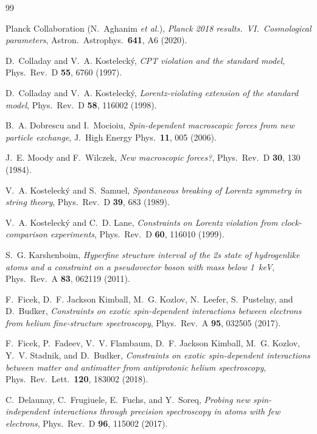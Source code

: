 \documentclass[12pt,a4paper]{report}
\begin{document}
\begin{thebibliography}{99}

Planck Collaboration (N.~Aghanim \textit{et al.}),
\textit{Planck 2018 results.\ VI.\ Cosmological parameters},
Astron.\ Astrophys.\ \textbf{641}, A6 (2020).

D.~Colladay and V.~A. Kosteleck\'{y},
\textit{CPT violation and the standard model},
Phys.\ Rev.\ D \textbf{55}, 6760 (1997).

D.~Colladay and V.~A. Kosteleck\'{y},
\textit{Lorentz-violating extension of the standard model},
Phys.\ Rev.\ D \textbf{58}, 116002 (1998).

B.~A. Dobrescu and I.~Mocioiu,
\textit{Spin-dependent macroscopic forces from new particle exchange},
J.\ High Energy Phys.\ \textbf{11}, 005 (2006).

J.~E. Moody and F.~Wilczek,
\textit{New macroscopic forces?},
Phys.\ Rev.\ D \textbf{30}, 130 (1984).

V.~A. Kosteleck\'{y} and S.~Samuel,
\textit{Spontaneous breaking of Lorentz symmetry in string theory},
Phys.\ Rev.\ D \textbf{39}, 683 (1989).

V.~A. Kosteleck\'{y} and C.~D. Lane,
\textit{Constraints on Lorentz violation from clock-comparison experiments},
Phys.\ Rev.\ D \textbf{60}, 116010 (1999).

S.~G. Karshenboim,
\textit{Hyperfine structure interval of the 2s state of hydrogenlike atoms
and a constraint on a pseudovector boson with mass below 1~keV},
Phys.\ Rev.\ A \textbf{83}, 062119 (2011).

F.~Ficek, D.~F. Jackson Kimball, M.~G. Kozlov, N.~Leefer, S.~Pustelny, and
D.~Budker,
\textit{Constraints on exotic spin-dependent interactions between electrons
from helium fine-structure spectroscopy},
Phys.\ Rev.\ A \textbf{95}, 032505 (2017).

F.~Ficek, P.~Fadeev, V.~V. Flambaum, D.~F. Jackson Kimball, M.~G. Kozlov,
Y.~V. Stadnik, and D.~Budker,
\textit{Constraints on exotic spin-dependent interactions between matter and
antimatter from antiprotonic helium spectroscopy},
Phys.\ Rev.\ Lett.\ \textbf{120}, 183002 (2018).

C.~Delaunay, C.~Frugiuele, E.~Fuchs, and Y.~Soreq,
\textit{Probing new spin-independent interactions through precision
spectroscopy in atoms with few electrons},
Phys.\ Rev.\ D \textbf{96}, 115002 (2017).


\end{thebibliography}
\end{document}
